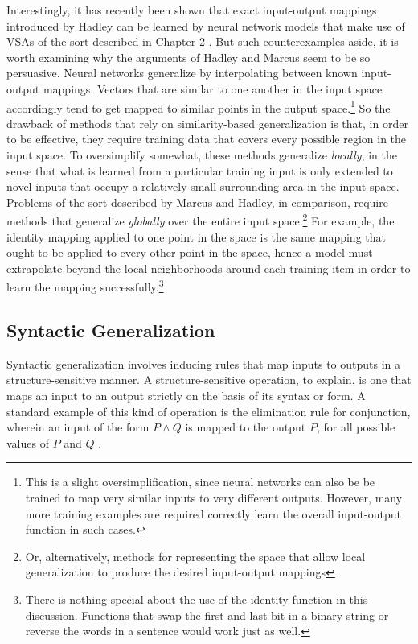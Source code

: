 Interestingly, it has recently been shown that exact input-output mappings introduced by Hadley can be learned by neural network models that make use of VSAs of the sort described in Chapter 2 \citep[][pp. 269-72]{Eliasmith:2013}. But such counterexamples aside, it is worth examining why the arguments of Hadley and Marcus seem to be so persuasive. Neural networks generalize by interpolating between known input-output mappings. Vectors that are similar to one another in the input space accordingly tend to get mapped to similar points in the output space.\footnote{This is a slight oversimplification, since neural networks can also be be trained to map very similar inputs to very different outputs. However, many more training examples are required correctly learn the overall input-output function in such cases.} So the drawback of methods that rely on similarity-based generalization is that, in order to be effective, they require training data that covers every possible region in the input space. To oversimplify somewhat, these methods generalize \textit{locally}, in the sense that what is learned from a particular training input is only extended to novel inputs that occupy a relatively small surrounding area in the input space. Problems of the sort described by Marcus and Hadley, in comparison, require methods that generalize \textit{globally} over the entire input space.\footnote{Or, alternatively, methods for representing the space that allow local generalization to produce the desired input-output mappings} For example, the identity mapping applied to one point in the space is the same mapping that ought to be applied to every other point in the space, hence a model must extrapolate beyond the local neighborhoods around each training item in order to learn the mapping successfully.\footnote{There is nothing special about the use of the identity function in this discussion. Functions that swap the first and last bit in a binary string or reverse the words in a sentence would work just as well.}

\subsection{Syntactic Generalization}

Syntactic generalization involves inducing rules that map inputs to outputs in a structure-sensitive manner. A structure-sensitive operation, to explain, is one that maps an input to an output strictly on the basis of its syntax or form. A standard example of this kind of operation is the elimination rule for conjunction, wherein an input of the form $P \land Q$ is mapped to the output $P$, for all possible values of $P$ and $Q$ \citep{FodorPylyshyn:1988}. 

